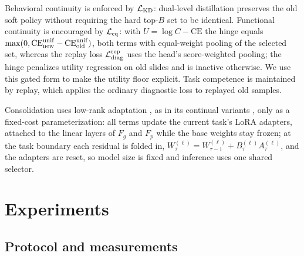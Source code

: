 \documentclass{article}
\def\L{{\cal L}}
\newcommand{\Fg}{F_g}
\newcommand{\Fp}{F_p}
\begin{document}
Behavioral continuity is enforced by $\L_{\rm KD}$: dual-level distillation preserves the old soft policy without requiring the hard top-$B$ set to be identical. Functional continuity is encouraged by $\L_{\rm eq}$: with $U=\log C-\mathrm{CE}$ the hinge equals $\max(0,\mathrm{CE}^{\rm unif}_{\rm new}-\mathrm{CE}^{\rm unif}_{\rm old})$, both terms with equal-weight pooling of the selected set, whereas the replay loss $\L_{\mathrm{diag}}^{\mathrm{rep}}$ uses the head's score-weighted pooling; the hinge penalizes utility regression on old slides and is inactive otherwise. We use this gated form to make the utility floor explicit. Task competence is maintained by replay, which applies the ordinary diagnostic loss to replayed old samples.

Consolidation uses low-rank adaptation \cite{hu2022lora}, as in its continual variants \cite{liang2024inflora,wu2025sdlora,he2025cllora,chen2026flexem}, only as a fixed-cost parameterization: all terms update the current task's LoRA adapters, attached to the linear layers of $\Fg$ and $\Fp$ while the base weights stay frozen; at the task boundary each residual is folded in, $W^{(\ell)}_{\tau}=W^{(\ell)}_{\tau-1}+B^{(\ell)}_\tau A^{(\ell)}_\tau$, and the adapters are reset, so model size is fixed and inference uses one shared selector.

\section{Experiments}
\label{sec:exp}

\subsection{Protocol and measurements}
\end{document}
